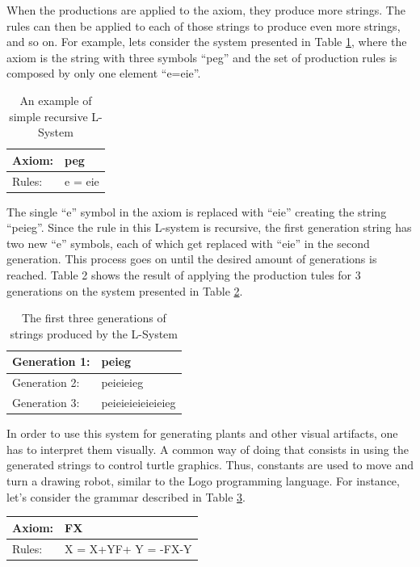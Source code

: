 \documentclass{article}
\begin{document}
When the productions are applied to the axiom, they produce more strings. The rules can then be applied
to each of those strings to produce even more strings, and so on. For example, lets consider the system presented
in Table \ref{example1}, where the axiom is the string with three symbols ``peg'' and the set of production
rules is composed by only one element ``e=eie''.

\begin{table}[!h]
\centering
\begin{tabular}{|l|l|}
\hline
Axiom: & peg     \\ \hline
Rules: & e = eie \\ \hline
\end{tabular}
\label{example1}
\caption{An example of simple recursive L-System}
\end{table}

The single ``e'' symbol in the axiom is replaced with ``eie'' creating the string ``peieg''.
Since the rule in this L-system is recursive, the first generation string has two new ``e''
symbols, each of which get replaced with  ``eie'' in the second generation. This process goes
on until the desired amount of generations is reached. Table 2 shows the result of applying
the production tules for 3 generations on the system presented in Table \ref{example2}.

\begin{table}[]
\centering
\begin{tabular}{|l|l|}
\hline
Generation 1: & peieg             \\ \hline
Generation 2: & peieieieg         \\ \hline
Generation 3: & peieieieieieieieg \\ \hline
\end{tabular}
\label{example2}
\caption{The first three generations of strings produced by the L-System}
\end{table}

In order to use this system for generating plants and other visual artifacts, one
has to interpret them visually. A common way of doing that consists in using
the generated strings to control turtle graphics. Thus, constants are
used to move and turn a drawing robot, similar to the Logo programming language.
For instance, let's consider the grammar described in Table \ref{example3}.

\begin{table}[!h]
\centering
\begin{tabular}{|l|p{25mm}|}
\hline
Axiom: & FX        \\ \hline
Rules: & X = X+YF+ \newline Y = -FX-Y \\ \hline
\end{tabular}
\label{example3}
\end{table}
\end{document}
